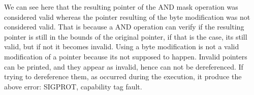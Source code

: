\documentclass[a4paper, 11pt]{article}
\newcommand{\cmark}{\ding{51}}
\newcommand{\xmark}{\ding{55}}
\newcommand{\ptraddress}[1]{%
    0x\textcolor{gray}{\scalebox{0.9}{fffffff}}#1%
}
\begin{document}
\begin{center}

	\end{center}
We can see here that the resulting pointer of the AND mask operation was considered valid whereas the pointer resulting of the byte modification was not considered valid. That is because a AND operation can verify if the resulting pointer is still in the bounds of the original pointer, if that is the case, its still valid, but if not it becomes invalid. Using a byte modification is not a valid modification of a pointer because its not supposed to happen. 
Invalid pointers can be printed, and they appear as invalid, hence can not be dereferenced. If trying to dereference them, as occurred during the execution, it produce the above error: SIGPROT, capability tag fault.
\end{document}
